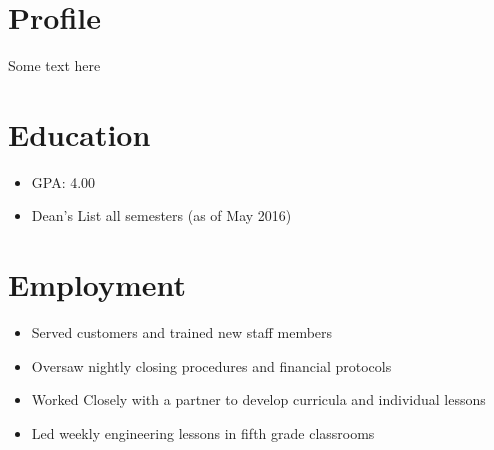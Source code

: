 \documentclass[12 pt]{resume}
\begin{document}

    \section{Profile}
    Some text here

    \section{Education}
        \begin{itemize}[noitemsep]
            \item GPA: 4.00
            \item Dean's List all semesters (as of May 2016)
        \end{itemize}

    \section{Employment}
        \begin{itemize}[noitemsep]
            \item Served customers and trained new staff members
            \item Oversaw nightly closing procedures and financial protocols
        \end{itemize}
        \begin{itemize}[noitemsep]
            \item Worked Closely with a partner to develop curricula and individual lessons
            \item Led weekly engineering lessons in fifth grade classrooms
        \end{itemize}
\end{document}
